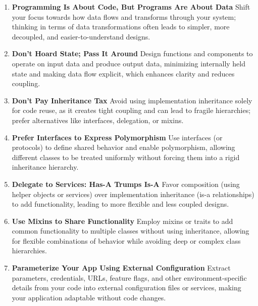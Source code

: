 \documentclass[11pt]{article}
\begin{document}
\begin{tcolorbox}[pragchapterbox={Chapter 5: Bend, or Break}]
\begin{multicols}{2}
\begin{enumerate}[label=\arabic*., start=41, itemsep=1ex, topsep=0pt, partopsep=0pt, labelwidth=!, labelindent=0pt, leftmargin=*]
    \item \textbf{Programming Is About Code, But Programs Are About Data}
    Shift your focus towards how data flows and transforms through your system; thinking in terms of data transformations often leads to simpler, more decoupled, and easier-to-understand designs.

    \item \textbf{Don’t Hoard State; Pass It Around}
    Design functions and components to operate on input data and produce output data, minimizing internally held state and making data flow explicit, which enhances clarity and reduces coupling.

    \item \textbf{Don’t Pay Inheritance Tax}
    Avoid using implementation inheritance solely for code reuse, as it creates tight coupling and can lead to fragile hierarchies; prefer alternatives like interfaces, delegation, or mixins.

    \item \textbf{Prefer Interfaces to Express Polymorphism}
    Use interfaces (or protocols) to define shared behavior and enable polymorphism, allowing different classes to be treated uniformly without forcing them into a rigid inheritance hierarchy.

    \item \textbf{Delegate to Services: Has-A Trumps Is-A}
    Favor composition (using helper objects or services) over implementation inheritance (is-a relationships) to add functionality, leading to more flexible and less coupled designs.

    \item \textbf{Use Mixins to Share Functionality}
    Employ mixins or traits to add common functionality to multiple classes without using inheritance, allowing for flexible combinations of behavior while avoiding deep or complex class hierarchies.

    \item \textbf{Parameterize Your App Using External Configuration}
    Extract parameters, credentials, URLs, feature flags, and other environment-specific details from your code into external configuration files or services, making your application adaptable without code changes.
\end{enumerate}
\end{multicols}
\end{tcolorbox}
\end{document}
